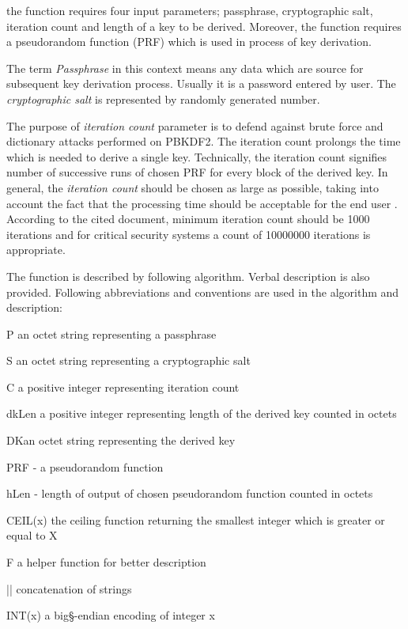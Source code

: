 \documentclass[nolof]{fithesis3}
\begin{document}
the function requires four input parameters; passphrase, cryptographic salt, iteration count and length of a key to be derived. Moreover, the function requires a pseudorandom function (PRF) which is used in process of key derivation.

The term \emph{Passphrase} in this context means any data which are source for subsequent key derivation process. Usually it is a password entered by user. The \emph{cryptographic salt} is represented by randomly generated number.

The purpose of \emph{iteration count} parameter is to defend against brute force and dictionary attacks performed on PBKDF2. The iteration count prolongs the time which is needed to derive a single key. Technically, the iteration count signifies number of successive runs of chosen PRF for every block of the derived key. In general, the \emph{iteration count} should be chosen as large as possible, taking into account the fact that the processing time should be acceptable for the end user \parencite{nistpbkdf2}. According to the cited document, minimum iteration count should be 1000 iterations and for critical security systems a count of 10000000 iterations is appropriate. 

The function is described by following algorithm. Verbal description is also provided. Following abbreviations and conventions are used in the algorithm and description:

\begin{description}
\item{P} an octet string representing a passphrase

\item{S} an octet string representing a cryptographic salt

\item{C} a positive integer representing iteration count

\item{dkLen} a positive integer representing length of the derived key counted in octets

\item{DK}an octet string representing the derived key

\item{PRF} - a pseudorandom function

\item{hLen} - length of output of chosen pseudorandom function counted in octets

\item{CEIL(x)} the ceiling function returning the smallest integer which is greater or equal to X

\item{F} a helper function for better description

\item{||} concatenation of strings

\item{INT(x)} a big§-endian encoding of integer x
\end{description}
\end{document}
